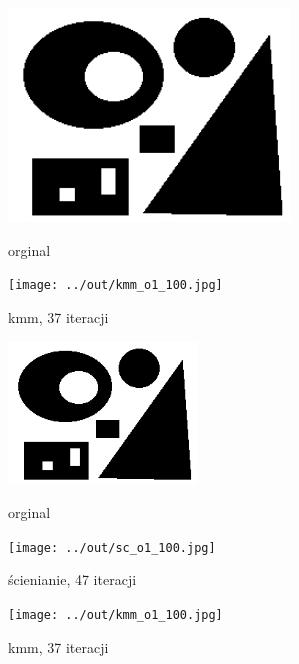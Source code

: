 \documentclass[a4paper,12pt]{article}
\begin{document}
\begin{figure}[h!]
\begin{minipage}[t]{7.5cm}
\begin{center}
\includegraphics[width=7.5cm]{../in/o1.jpg}
\caption{orginal}
\end{center}
\end{minipage}
\hfill
\begin{minipage}[t]{7.5cm}
\begin{center}
\texttt{[image: ../out/kmm\_o1\_100.jpg]}
\caption{kmm, 37 iteracji}
\end{center}
\end{minipage}
\end{figure}

\begin{figure}[h!]
\begin{minipage}[t]{5cm}
\begin{center}
\includegraphics[width=5cm]{../in/o1.jpg}
\caption{orginal}
\end{center}
\end{minipage}
\hfill
\begin{minipage}[t]{5cm}
\begin{center}
\texttt{[image: ../out/sc\_o1\_100.jpg]}
\caption{ścienianie, 47 iteracji}
\end{center}
\end{minipage}
\hfill
\begin{minipage}[t]{5cm}
\begin{center}
\texttt{[image: ../out/kmm\_o1\_100.jpg]}
\caption{kmm, 37 iteracji}
\end{center}
\end{minipage}
\end{figure}
\end{document}
